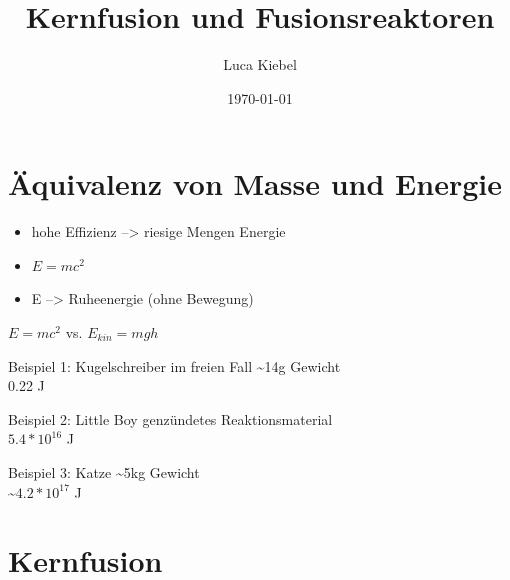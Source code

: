 \documentclass[10pt,a4paper, ngerman]{beamer}
\author{Luca Kiebel}
\title{Kernfusion und Fusionsreaktoren}
\date{\today}
\institute[HBBK]{Hans-Böckler-Berufskolleg}
\begin{document}
\begin{frame}
\titlepage
\end{frame}

\section[Energie aus Masse]{Äquivalenz von Masse und Energie}
\begin{frame}{\secname}{\subsecname}
\begin{itemize}[<+->]
\item hohe Effizienz --> riesige Mengen Energie
\item \(E=mc^2\)
\item E --> Ruheenergie (ohne Bewegung)
\end{itemize}
\end{frame}

\begin{frame}{\secname}{\(E=mc^2\) vs. \(E_{kin}=mgh\)}
\begin{exampleblock}{Beispiel 1: Kugelschreiber im freien Fall}
	\textasciitilde14g Gewicht \\
	0.22 J
\end{exampleblock}
\pause
\begin{exampleblock}{Beispiel 2: Little Boy} %
	 genzündetes Reaktionsmaterial \\
	\(5.4*10^{16}\) J 
\end{exampleblock}
\pause[4]
\begin{exampleblock}{Beispiel 3: Katze}
	\textasciitilde5kg Gewicht \\
	\textasciitilde\(4.2*10^{17}\) J
\end{exampleblock}
\end{frame}


\section{Kernfusion}
\end{document}
